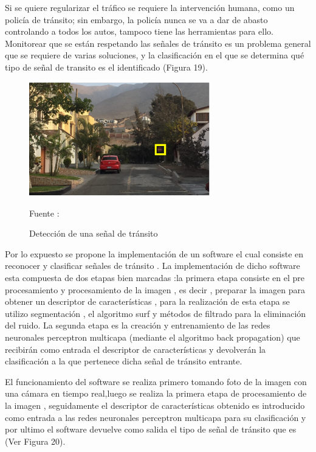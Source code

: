 \documentclass[a4paper, 12pt]{article}
\begin{document}
Si se quiere regularizar el tráfico se requiere la intervención humana, como un policía de tránsito; sin embargo, la policía nunca se va a dar de abasto controlando a todos los autos, tampoco tiene las herramientas para ello.
Monitorear que se están respetando las señales de tránsito es un problema general que se requiere de varias soluciones, y la clasificación en el que se determina qué tipo de señal de transito es el identificado (Figura 19).\par


\begin{figure}[ht]
\begin{center}
\includegraphics[width=0.7\textwidth]{problema2}
\end{center}
\begin{center}
\vskip -0.5cm
\caption{\small{Detección de una señal de tránsito}}
{\small{Fuente : \cite{ayunque}}}
\end{center}
\end{figure}


Por lo expuesto se propone la implementación de un software el cual consiste en reconocer y clasificar señales de tránsito . La implementación de dicho software esta compuesta de dos etapas bien marcadas :la primera etapa consiste en el pre procesamiento y procesamiento de la imagen , es decir , preparar la imagen para obtener un descriptor de características , para la realización de esta etapa se utilizo segmentación , el algoritmo surf y  métodos de filtrado para la eliminación del ruido.
La segunda etapa es la creación y entrenamiento de las redes neuronales perceptron multicapa (mediante el algoritmo back propagation) que recibirán como entrada el descriptor de características y devolverán la clasificación a la que pertenece dicha señal de tránsito entrante.\par
\vskip 0.5cm


El funcionamiento del software se realiza primero tomando foto de la imagen con una cámara en tiempo real,luego se realiza la primera etapa de procesamiento de la imagen , seguidamente  el descriptor de características obtenido es introducido como entrada a las redes neuronales perceptron multicapa para su clasificación y por ultimo el software devuelve como salida el tipo de señal de tránsito que es (Ver Figura 20).\par
\end{document}
